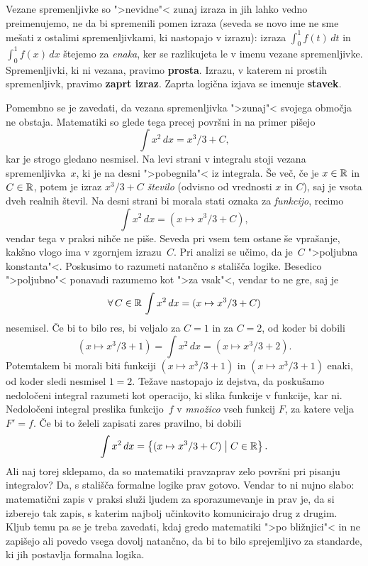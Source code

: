 Vezane spremenljivke so ">nevidne"< zunaj izraza in jih lahko vedno
preimenujemo, ne da bi spremenili pomen izraza (seveda se novo ime ne
sme mešati z ostalimi spremenljivkami, ki nastopajo v izrazu): izraza
$\int_0^1 f(t)\, d t$ in $\int_0^1 f(x)\, d x$ štejemo za
\emph{enaka}, ker se razlikujeta le v imenu vezane spremenljivke.
Spremenljivki, ki ni vezana, pravimo \textbf{prosta}. Izrazu, v katerem
ni prostih spremenljivk, pravimo \textbf{zaprt izraz}. Zaprta
logična izjava se imenuje \textbf{stavek}.

Pomembno se je zavedati, da vezana spremenljivka ">zunaj"< svojega
območja ne obstaja. Matematiki so glede tega precej površni in na
primer pišejo
%
\begin{equation*}
  \int x^2 \, d x = x^3/3 + C,
\end{equation*}
%
kar je strogo gledano nesmisel. Na levi strani v integralu stoji
vezana spremenljivka~$x$, ki je na desni ">pobegnila"< iz integrala.
Še več, če je $x \in \mathbb{R}$ in $C \in \mathbb{R}$, potem je izraz $x^3/3 + C$
\emph{število} (odvisno od vrednosti $x$ in $C$), saj je vsota dveh
realnih števil. Na desni strani bi morala stati oznaka za
\emph{funkcijo}, recimo
%
\begin{equation*}
  \int x^2 \, d x = (x \mapsto x^3/3 + C),
\end{equation*}
%
vendar tega v praksi nihče ne piše. Seveda pri vsem tem ostane še
vprašanje, kakšno vlogo ima v zgornjem izrazu~$C$. Pri analizi se
učimo, da je~$C$ ">poljubna konstanta"<. Poskusimo to razumeti
natančno s stališča logike. Besedico ">poljubno"< ponavadi razumemo
kot ">za vsak"<, vendar to ne gre, saj je
%
\begin{equation*}
  \forall\, C \in \mathbb{R} \, \int x^2 \, d x = (x \mapsto x^3/3 + C)
\end{equation*}
%
nesemisel. Če bi to bilo res, bi veljalo za $C = 1$ in za $C = 2$, od
koder bi dobili
%
\begin{equation*}
  (x \mapsto x^3/3 + 1) =
  \int x^2 \, d x =
  (x \mapsto x^3/3 + 2).
\end{equation*}
%
Potemtakem bi morali biti funkciji $(x \mapsto x^3/3 + 1)$ in $(x
\mapsto x^3/3 + 1)$ enaki, od koder sledi nesmisel $1 = 2$. Težave
nastopajo iz dejstva, da poskušamo nedoločeni integral razumeti kot
operacijo, ki slika funkcije v funkcije, kar ni. Nedoločeni integral
preslika funkcijo~$f$ v \emph{množico} vseh funkcij $F$, za katere
velja $F' = f$. Če bi to želeli zapisati zares pravilno, bi dobili
%
\begin{equation*}
  \int x^2 \, d x =
  \left\{(x \mapsto x^3/3 + C) \; \middle| \; C \in \mathbb{R}\right\}.
\end{equation*}
%
Ali naj torej sklepamo, da so matematiki pravzaprav zelo površni pri
pisanju integralov? Da, s stališča formalne logike prav gotovo. Vendar
to ni nujno slabo: matematični zapis v praksi služi ljudem za
sporazumevanje in prav je, da si izberejo tak zapis, s katerim najbolj
učinkovito komunicirajo drug z drugim. Kljub temu pa se je treba
zavedati, kdaj gredo matematiki ">po bližnjici"< in ne zapišejo ali
povedo vsega dovolj natančno, da bi to bilo sprejemljivo za standarde,
ki jih postavlja formalna logika.


